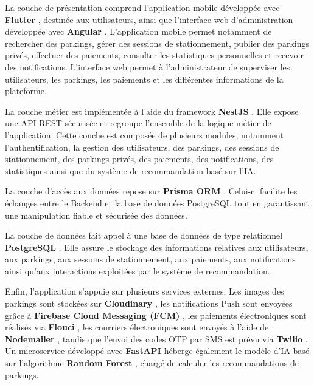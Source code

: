 \par La couche de présentation comprend l'application mobile développée avec \textbf{Flutter} \cite{flutter}, destinée aux utilisateurs, ainsi que l'interface web d'administration développée avec \textbf{Angular} \cite{angular}. L'application mobile permet notamment de rechercher des parkings, gérer des sessions de stationnement, publier des parkings privés, effectuer des paiements, consulter les statistiques personnelles et recevoir des notifications. L'interface web permet à l'administrateur de superviser les utilisateurs, les parkings, les paiements et les différentes informations de la plateforme.

\par La couche métier est implémentée à l'aide du framework \textbf{NestJS} \cite{nestjs}. Elle expose une API REST sécurisée et regroupe l'ensemble de la logique métier de l'application. Cette couche est composée de plusieurs modules, notamment l'authentification, la gestion des utilisateurs, des parkings, des sessions de stationnement, des parkings privés, des paiements, des notifications, des statistiques ainsi que du système de recommandation basé sur l'IA.

\par La couche d'accès aux données repose sur \textbf{Prisma ORM} \cite{prisma}. Celui-ci facilite les échanges entre le Backend et la base de données PostgreSQL tout en garantissant une manipulation fiable et sécurisée des données.

\par La couche de données fait appel à une base de données de type relationnel \textbf{PostgreSQL} \cite{postgresql}. Elle assure le stockage des informations relatives aux utilisateurs, aux parkings, aux sessions de stationnement, aux paiements, aux notifications ainsi qu'aux interactions exploitées par le système de recommandation.

\par Enfin, l'application s'appuie sur plusieurs services externes. Les images des parkings sont stockées sur \textbf{Cloudinary} \cite{cloudinary}, les notifications Push sont envoyées grâce à \textbf{Firebase Cloud Messaging (FCM)} \cite{firebase}, les paiements électroniques sont réalisés via \textbf{Flouci} \cite{flouci}, les courriers électroniques sont envoyés à l'aide de \textbf{Nodemailer} \cite{nodemailer}, tandis que l'envoi des codes OTP par SMS est prévu via \textbf{Twilio} \cite{twilio}. Un microservice développé avec \textbf{FastAPI} \cite{fastapi} héberge également le modèle d'IA basé sur l'algorithme \textbf{Random Forest} \cite{breiman2001randomforest}, chargé de calculer les recommandations de parkings.

